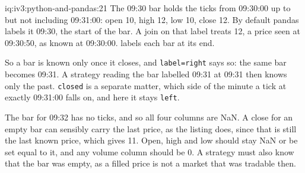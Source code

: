 \begin{solution}{iq:iv3:python-and-pandas:21}
The 09:30 bar holds the ticks from 09:30:00 up to but not including 09:31:00: open 10, high 12, low 10, close 12. By default pandas labels it 09:30, the start of the bar. A join on that label treats 12, a price seen at 09:30:50, as known at 09:30:00.  labels each bar at its end.
\label{lst:iv3:pp:bars}

So a bar is known only once it closes, and \texttt{label=\textquotesingle right\textquotesingle} says so: the same bar becomes 09:31. A strategy reading the bar labelled 09:31 at 09:31 then knows only the past. \texttt{closed} is a separate matter, which side of the minute a tick at exactly 09:31:00 falls on, and here it stays \texttt{left}.

The bar for 09:32 has no ticks, and so all four columns are NaN. A close for an empty bar can sensibly carry the last price, as the listing does, since that is still the last known price, which gives 11. Open, high and low should stay NaN or be set equal to it, and any volume column should be 0. A strategy must also know that the bar was empty, as a filled price is not a market that was tradable then.

\end{solution}

